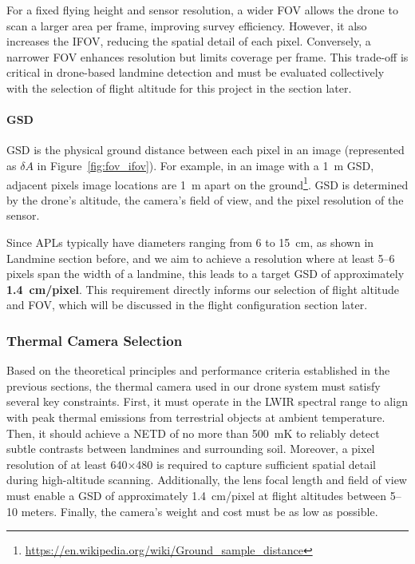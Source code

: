 For a fixed flying height and sensor resolution, a wider \gls{FOV} allows the drone to scan a larger area per frame, improving survey efficiency. However, it also increases the \gls{IFOV}, reducing the spatial detail of each pixel. Conversely, a narrower \gls{FOV} enhances resolution but limits coverage per frame. This trade-off is critical in drone-based landmine detection and must be evaluated collectively with the selection of flight altitude for this project in the section later.


\paragraph{\gls{GSD}}

\gls{GSD} is the physical ground distance between each pixel in an image (represented as \( \delta A \) in Figure~\ref{fig:fov_ifov}). For example, in an image with a 1~m \gls{GSD}, adjacent pixels image locations are 1~m apart on the ground\footnote{\url{https://en.wikipedia.org/wiki/Ground_sample_distance}}. \gls{GSD} is determined by the drone’s altitude, the camera’s field of view, and the pixel resolution of the sensor.

Since \gls{APL}s typically have diameters ranging from 6 to 15~cm, as shown in Landmine section before, and we aim to achieve a resolution where at least 5–6 pixels span the width of a landmine, this leads to a target \gls{GSD} of approximately \textbf{1.4~cm/pixel}. This requirement directly informs our selection of flight altitude and \gls{FOV}, which will be discussed in the flight configuration section later.


\subsubsection{Thermal Camera Selection}\label{thermal_selection}

Based on the theoretical principles and performance criteria established in the previous sections, the thermal camera used in our drone system must satisfy several key constraints. First, it must operate in the \gls{LWIR} spectral range to align with peak thermal emissions from terrestrial objects at ambient temperature. Then, it should achieve a \gls{NETD} of no more than 500~mK to reliably detect subtle contrasts between landmines and surrounding soil. Moreover, a pixel resolution of at least 640×480 is required to capture sufficient spatial detail during high-altitude scanning. Additionally, the lens focal length and field of view must enable a \gls{GSD} of approximately 1.4~cm/pixel at flight altitudes between 5–10 meters. Finally, the camera’s weight and cost must be as low as possible.

